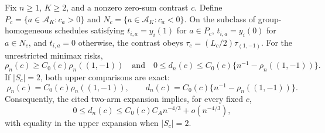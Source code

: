 Fix \(n\geq 1\), \(K\geq 2\), and a nonzero zero-sum contrast \(c\). Define \(P_c=\{a\in\mathcal A_K:c_a>0\}\) and \(N_c=\{a\in\mathcal A_K:c_a<0\}\). On the subclass of group-homogeneous schedules satisfying \(t_{i,a}=y_i(1)\) for \(a\in P_c\), \(t_{i,a}=y_i(0)\) for \(a\in N_c\), and \(t_{i,a}=0\) otherwise, the contrast obeys \(\tau_c=(L_c/2)\tau_{(1,-1)}\). For the unrestricted minimax risks,
\[
 \rho_n(c)\geq C_0(c)\rho_n((1,-1))
 \quad\text{and}\quad
 0\leq d_n(c)\leq C_0(c)\{n^{-1}-\rho_n((1,-1))\}.
\]
If \(|S_c|=2\), both upper comparisons are exact:
\[
 \rho_n(c)=C_0(c)\rho_n((1,-1)),
 \qquad
 d_n(c)=C_0(c)\{n^{-1}-\rho_n((1,-1))\}.
\]
Consequently, the cited two-arm expansion implies, for every fixed \(c\),
\[
 0\leq d_n(c)\leq C_0(c)C_A n^{-4/3}+o(n^{-4/3}),
\]
with equality in the upper expansion when \(|S_c|=2\).